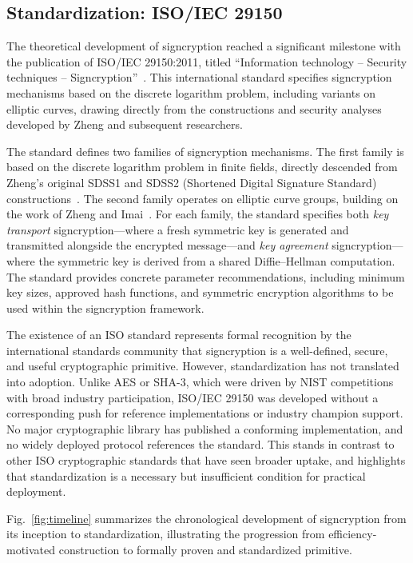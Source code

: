 \documentclass[conference]{IEEEtran}
\begin{document}
\subsection{Standardization: ISO/IEC 29150}

The theoretical development of signcryption reached a significant milestone with the publication of ISO/IEC 29150:2011, titled ``Information technology -- Security techniques -- Signcryption''~\cite{iso29150}. This international standard specifies signcryption mechanisms based on the discrete logarithm problem, including variants on elliptic curves, drawing directly from the constructions and security analyses developed by Zheng and subsequent researchers.

The standard defines two families of signcryption mechanisms. The first family is based on the discrete logarithm problem in finite fields, directly descended from Zheng's original SDSS1 and SDSS2 (Shortened Digital Signature Standard) constructions~\cite{zheng1997}. The second family operates on elliptic curve groups, building on the work of Zheng and Imai~\cite{zheng1998}. For each family, the standard specifies both \textit{key transport} signcryption---where a fresh symmetric key is generated and transmitted alongside the encrypted message---and \textit{key agreement} signcryption---where the symmetric key is derived from a shared Diffie--Hellman computation. The standard provides concrete parameter recommendations, including minimum key sizes, approved hash functions, and symmetric encryption algorithms to be used within the signcryption framework.

The existence of an ISO standard represents formal recognition by the international standards community that signcryption is a well-defined, secure, and useful cryptographic primitive. However, standardization has not translated into adoption. Unlike AES or SHA-3, which were driven by NIST competitions with broad industry participation, ISO/IEC 29150 was developed without a corresponding push for reference implementations or industry champion support. No major cryptographic library has published a conforming implementation, and no widely deployed protocol references the standard. This stands in contrast to other ISO cryptographic standards that have seen broader uptake, and highlights that standardization is a necessary but insufficient condition for practical deployment.

Fig.~\ref{fig:timeline} summarizes the chronological development of signcryption from its inception to standardization, illustrating the progression from efficiency-motivated construction to formally proven and standardized primitive.
\end{document}
